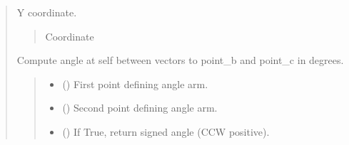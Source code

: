\documentclass[letterpaper,10pt,english]{sphinxmanual}
\begin{document}
\begin{quote}
\begin{fulllineitems}
\begin{fulllineitems}
\begin{quote}
\begin{description}
\end{description}\end{quote}

\end{fulllineitems}


\begin{fulllineitems}
\label{\detokenize{pygeox:pygeox.basic_objects.Point.y}}
\pysigstartsignatures
\pysigline
{}
\pysigstopsignatures
\sphinxAtStartPar
Y coordinate.
\begin{quote}\begin{description}
\sphinxAtStartPar
Coordinate

\end{description}\end{quote}

\end{fulllineitems}


\begin{fulllineitems}
\label{\detokenize{pygeox:pygeox.basic_objects.Point.angle}}
\pysigstartsignatures
\pysiglinewithargsret
{}
{\sphinxparamcomma {}\sphinxparamcomma {}}
{}
\pysigstopsignatures
\sphinxAtStartPar
Compute angle at self between vectors to point\_b and point\_c in degrees.
\begin{quote}\begin{description}
\begin{itemize}
\item {} 
\sphinxAtStartPar
{} () \textendash{} First point defining angle arm.

\item {} 
\sphinxAtStartPar
{} () \textendash{} Second point defining angle arm.

\item {} 
\sphinxAtStartPar
{} () \textendash{} If True, return signed angle (CCW positive).


\end{itemize}
\end{description}
\end{quote}
\end{fulllineitems}
\end{fulllineitems}
\end{quote}
\end{document}
